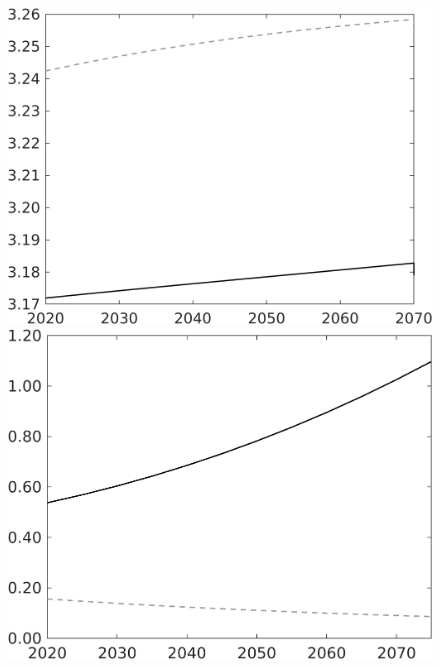 \documentclass[12pt]{article}
\begin{document}
\begin{figure}
\begin{minipage}[]{0.32\textwidth}
	\end{minipage}
	\begin{minipage}[]{0.32\textwidth}
		\includegraphics[width=1\textwidth]{../../codding_model/own_basedOnFried/optimalPol_010922_revision/figures/all_13Sept22/LevTaufNoTauf_TaulCalib_regime0_gAn_spillover0_nsk1_xgr0_knspil1_sep1_LFlimit0_emsbase0_countec0_GovRev0_etaa0.79_lgd0.png}
	\end{minipage}
	\begin{minipage}[]{0.32\textwidth}
		\includegraphics[width=1\textwidth]{../../codding_model/own_basedOnFried/optimalPol_010922_revision/figures/all_13Sept22/LevTaufNoTauf_TaulCalib_regime0_LgLf_spillover0_nsk1_xgr0_knspil1_sep1_LFlimit0_emsbase0_countec0_GovRev0_etaa0.79_lgd0.png}
	\end{minipage}
\end{figure}
\end{document}
